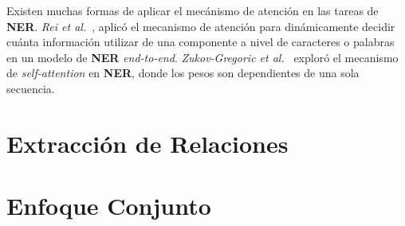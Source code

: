 Existen muchas formas de aplicar el mec\'anismo de atenci\'on en las tareas de \textbf{NER}. \emph{Rei et al.}~\cite{rei2016attending}, aplic\'o el mecanismo de atenci\'on para din\'amicamente decidir cu\'anta informaci\'on utilizar de una componente a nivel de caracteres o palabras en un modelo de \textbf{NER} \emph{end-to-end}. \emph{Zukov-Gregoric et al.}~\cite{zukov2017neural} explor\'o el mecanismo de \emph{self-attention} en \textbf{NER}, donde los pesos son dependientes de una sola secuencia.

\section{Extracción de Relaciones}

\section{Enfoque Conjunto}

